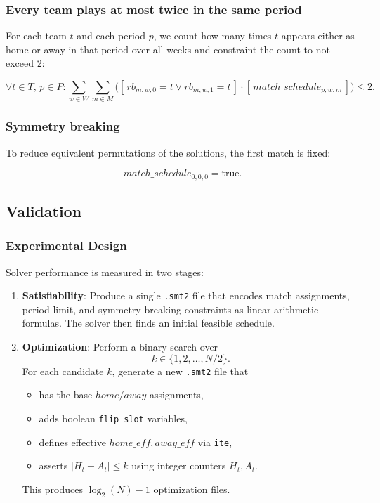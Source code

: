 \subsubsection{Every team plays at most twice in the same period}

For each team $t$ and each period $p$, we count how many times $t$ appears either as home or away in that period over all weeks and constraint the count to not exceed 2:

\[
\forall t \in T,\, p \in P: 
\sum_{w \in W} \sum_{m \in M} 
\big(
[\,rb_{m,w,0} = t \lor rb_{m,w,1} = t\,] \cdot [\,match\_schedule_{p,w,m}\,]
\big) \leq 2.
\]

\subsubsection{Symmetry breaking}

To reduce equivalent permutations of the solutions, the first match is fixed:

\[
match\_schedule_{0,0,0} = \text{true}.
\]

\subsection{Validation}

\subsubsection{Experimental Design}

Solver performance is measured in two stages:
\begin{enumerate}
  \item \textbf{Satisfiability}: Produce a single \texttt{.smt2} file that encodes match assignments, period-limit, and symmetry breaking constraints as linear arithmetic formulas. The solver then finds an initial feasible schedule.
  \item \textbf{Optimization}: Perform a binary search over 
  \[
    k \in \{1,2,\dots,N/2\}.
  \]
  For each candidate \(k\), generate a new \texttt{.smt2} file that
  \begin{itemize}
    \item has the base \(home/away\) assignments,
    \item adds boolean \texttt{flip\_slot} variables,
    \item defines effective \(home\_eff,away\_eff\) via \texttt{ite},
    \item asserts \(\lvert H_t - A_t\rvert \le k\) using integer counters \(H_t,A_t\).
  \end{itemize}
  This produces \(\log_2(N) - 1\) optimization files.
\end{enumerate}

